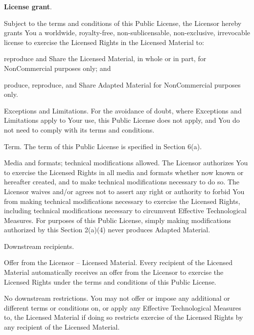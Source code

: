 \begin{doclicense@enumerate}
\item \textbf{License grant}.
\begin{doclicense@enumerate}
\item Subject to the terms and conditions of this Public License, the Licensor hereby grants You a worldwide, royalty-free, non-sublicensable, non-exclusive, irrevocable license to exercise the Licensed Rights in the Licensed Material to:
\begin{doclicense@enumerate}
\item reproduce and Share the Licensed Material, in whole or in part, for NonCommercial purposes only; and
\item produce, reproduce, and Share Adapted Material for NonCommercial purposes only.
\end{doclicense@enumerate}
\item Exceptions and Limitations. For the avoidance of doubt, where Exceptions and Limitations apply to Your use, this Public License does not apply, and You do not need to comply with its terms and conditions.
\item Term. The term of this Public License is specified in Section 6(a).
\item Media and formats; technical modifications allowed. The Licensor authorizes You to exercise the Licensed Rights in all media and formats whether now known or hereafter created, and to make technical modifications necessary to do so. The Licensor waives and/or agrees not to assert any right or authority to forbid You from making technical modifications necessary to exercise the Licensed Rights, including technical modifications necessary to circumvent Effective Technological Measures. For purposes of this Public License, simply making modifications authorized by this Section 2(a)(4) never produces Adapted Material.
\item Downstream recipients.

 \begin{doclicense@enumerate}
\item Offer from the Licensor – Licensed Material. Every recipient of the Licensed Material automatically receives an offer from the Licensor to exercise the Licensed Rights under the terms and conditions of this Public License.
\item No downstream restrictions. You may not offer or impose any additional or different terms or conditions on, or apply any Effective Technological Measures to, the Licensed Material if doing so restricts exercise of the Licensed Rights by any recipient of the Licensed Material.
\end{doclicense@enumerate}


\end{doclicense@enumerate}
\end{doclicense@enumerate}
